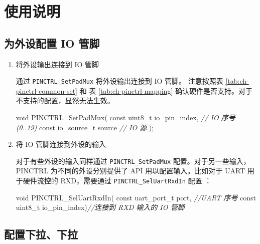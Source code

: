 \documentclass[
  12pt,
]{book}
\newenvironment{Shaded}{\begin{snugshade}}{\end{snugshade}}
\newcommand{\CommentTok}[1]{\textcolor[rgb]{0.56,0.35,0.01}{\textit{#1}}}
\newcommand{\DataTypeTok}[1]{\textcolor[rgb]{0.13,0.29,0.53}{#1}}
\newcommand{\NormalTok}[1]{#1}
\begin{document}
\hypertarget{ux4f7fux7528ux8bf4ux660e-1}{%
\section{使用说明}\label{ux4f7fux7528ux8bf4ux660e-1}}

\hypertarget{ux4e3aux5916ux8bbeux914dux7f6e-io-ux7ba1ux811a}{%
\subsection{为外设配置 IO 管脚}\label{ux4e3aux5916ux8bbeux914dux7f6e-io-ux7ba1ux811a}}

\begin{enumerate}
\def\labelenumi{\arabic{enumi}.}
\item
  将外设输出连接到 IO 管脚

  通过 \texttt{PINCTRL\_SetPadMux} 将外设输出连接到 IO 管脚。
  注意按照表 \ref{tab:ch-pinctrl-common-set} 和 表 \ref{tab:ch-pinctrl-mapping}
  确认硬件是否支持。对于不支持的配置，显然无法生效。

\begin{Shaded}
\begin{Highlighting}[]
\DataTypeTok{void}\NormalTok{ PINCTRL_SetPadMux(}
  \DataTypeTok{const} \DataTypeTok{uint8_t}\NormalTok{ io_pin_index, }\CommentTok{// IO 序号 (0..19)}
  \DataTypeTok{const}\NormalTok{ io_source_t source    }\CommentTok{// IO 源}
\NormalTok{);}
\end{Highlighting}
\end{Shaded}
\item
  将 IO 管脚连接到外设的输入

  对于有些外设的输入同样通过 \texttt{PINCTRL\_SetPadMux} 配置。对于另一些输入，
  PINCTRL 为不同的外设分别提供了 API 用以配置输入。比如对于 UART 用于硬件流控的
  RXD，需要通过 \texttt{PINCTRL\_SelUartRxdIn} 配置 ：

\begin{Shaded}
\begin{Highlighting}[]
\DataTypeTok{void}\NormalTok{ PINCTRL_SelUartRxdIn(}
    \DataTypeTok{const}\NormalTok{ uart_port_t port, }\CommentTok{//UART 序号}
    \DataTypeTok{const} \DataTypeTok{uint8_t}\NormalTok{ io_pin_index)}\CommentTok{//连接到 RXD 输入的 IO 管脚}
\end{Highlighting}
\end{Shaded}
\end{enumerate}

\hypertarget{ux914dux7f6eux4e0bux62c9ux4e0bux62c9}{%
\subsection{配置下拉、下拉}\label{ux914dux7f6eux4e0bux62c9ux4e0bux62c9}}
\end{document}
